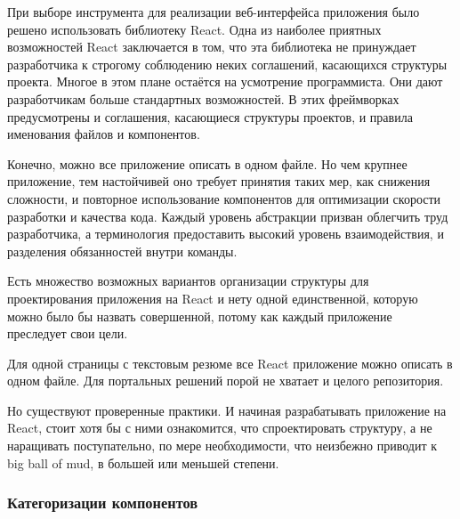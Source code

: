 При выборе инструмента для реализации веб-интерфейса приложения было решено использовать библиотеку React.
Одна из наиболее приятных возможностей React заключается в том, что эта библиотека не принуждает разработчика к строгому соблюдению неких соглашений, касающихся структуры проекта.
Многое в этом плане остаётся на усмотрение программиста.
Они дают разработчикам больше стандартных возможностей.
В этих фреймворках предусмотрены и соглашения, касающиеся структуры проектов, и правила именования файлов и компонентов.

Конечно, можно все приложение описать в одном файле.
Но чем крупнее приложение, тем настойчивей оно требует принятия таких мер, как снижения сложности, и повторное использование компонентов для оптимизации скорости разработки и качества кода.
Каждый уровень абстракции призван облегчить труд разработчика, а терминология предоставить высокий уровень взаимодействия, и разделения обязанностей внутри команды.

Есть множество возможных вариантов организации структуры для проектирования приложения на React и нету одной единственной, которую можно было бы назвать совершенной, потому как каждый приложение преследует свои цели.

Для одной страницы с текстовым резюме все React приложение можно описать в одном файле. Для портальных решений порой не хватает и целого репозитория.

Но существуют проверенные практики.
И начиная разрабатывать приложение на React, стоит хотя бы с ними ознакомится, что спроектировать структуру, а не наращивать поступательно, по мере необходимости, что неизбежно приводит к big ball of mud, в большей или меньшей степени.


\subsubsection{Категоризации компонентов}\hfill

